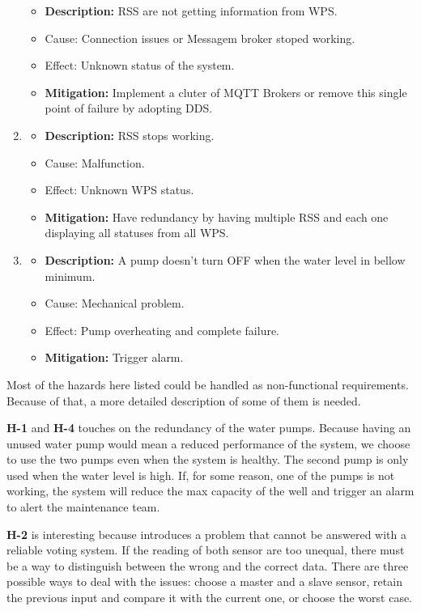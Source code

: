 \documentclass[11pt]{article}
\begin{document}
\begin{enumerate}[leftmargin=4em, font=\small, label=\textbf{H-\arabic*:}]
		\begin{itemize}
		\setlength\itemsep{0em}
    		\item \textbf{Description:} RSS are not getting information from WPS.
		\item Cause: Connection issues or Messagem broker stoped working.
    		\item Effect: Unknown status of the system.
    		\item \textbf{Mitigation:} Implement a cluter of MQTT Brokers or remove this single point of failure by adopting DDS.
		\end{itemize} 
	\item 
		\begin{itemize}
		\setlength\itemsep{0em}
    		\item \textbf{Description:} RSS stops working.
		\item Cause: Malfunction.
    		\item Effect: Unknown WPS status.
    		\item \textbf{Mitigation:} Have redundancy by having multiple RSS and each one displaying all statuses from all WPS.
		\end{itemize} 
	\item 
		\begin{itemize}
		\setlength\itemsep{0em}
    		\item \textbf{Description:} A pump doesn't turn OFF when the water level in bellow minimum.
			\item Cause: Mechanical problem.
    		\item Effect: Pump overheating and complete failure.
    		\item \textbf{Mitigation:} Trigger alarm.
		\end{itemize} 
\end{enumerate}

Most of the hazards here listed could be handled as non-functional requirements. Because of that, a more detailed description of some of them is needed.

\textbf{H-1} and \textbf{H-4} touches on the redundancy of the water pumps. Because having an unused water pump would mean a reduced performance of the system, we choose to use the two pumps even when the system is healthy. The second pump is only used when the water level is high. If, for some reason, one of the pumps is not working, the system will reduce the max capacity of the well and trigger an alarm to alert the maintenance team.

\textbf{H-2} is interesting because introduces a problem that cannot be answered with a reliable voting system. If the reading of both sensor are too unequal, there must be a way to distinguish between the wrong and the correct data. There are three possible ways to deal with the issues: choose a master and a slave sensor, retain the previous input and compare it with the current one, or choose the worst case.
\end{document}
